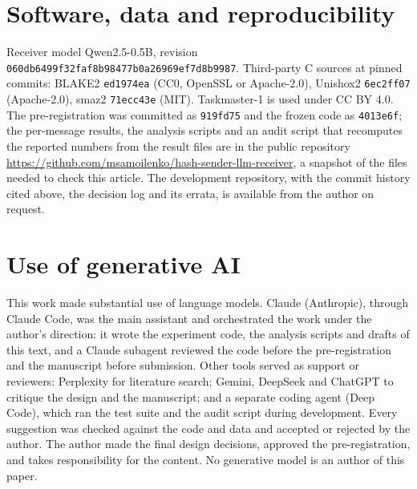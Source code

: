 \documentclass[11pt]{article}
\begin{document}
\section*{Software, data and reproducibility}

Receiver model Qwen2.5-0.5B, revision \texttt{060db6499f32faf8b98477b0a26969ef7d8b9987}. Third-party C
sources at pinned commits: BLAKE2 \texttt{ed1974ea} (CC0, OpenSSL or Apache-2.0), Unishox2
\texttt{6ec2ff07} (Apache-2.0), smaz2 \texttt{71ecc43e} (MIT). Taskmaster-1 is used under CC BY 4.0.
The pre-registration was committed as \texttt{919fd75} and the frozen code as \texttt{4013e6f}; the
per-message results, the analysis scripts and an audit script that recomputes the reported numbers
from the result files are in the public repository
\url{https://github.com/msamoilenko/hash-sender-llm-receiver}, a snapshot of the files needed to
check this article. The development repository, with the commit history cited above, the decision
log and its errata, is available from the author on request.

\section*{Use of generative AI}

This work made substantial use of language models. Claude (Anthropic), through Claude Code, was the
main assistant and orchestrated the work under the author's direction: it wrote the experiment code,
the analysis scripts and drafts of this text, and a Claude subagent reviewed the code before the
pre-registration and the manuscript before submission. Other tools served as support or reviewers:
Perplexity for literature search; Gemini, DeepSeek and ChatGPT to critique the design and the
manuscript; and a separate coding agent (Deep Code), which ran the test suite and the audit script
during development. Every suggestion was checked against the code and data and accepted or rejected
by the author. The author made the final design decisions, approved the pre-registration, and takes
responsibility for the content. No generative model is an author of this paper.
\end{document}
